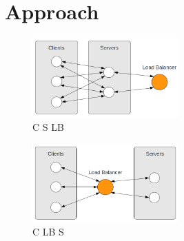 \documentclass[a4paper]{article}
\begin{document}

%
%
\section{Approach}

\begin{figure}[htb]
	\begin{center}
		\includegraphics[width=0.5\textwidth]{images/c_s_lb.png}
	\end{center}
	\caption{C S LB}
	\label{fig:cslb}
\end{figure}
\begin{figure}[htb]
	\begin{center}
		\includegraphics[width=0.5\textwidth]{images/c_lb_s.png}
	\end{center}
	\caption{C LB S}
	\label{fig:clbs}
\end{figure}
\end{document}
